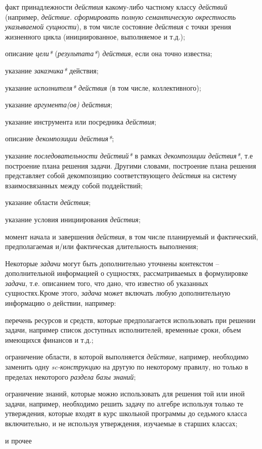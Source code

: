 \begin{SCn}
\begin{scnsubstruct}
{\begin{scnitemize}
\item факт принадлежности \textit{действия} какому-либо частному классу \textit{действий} (например,\textit{ действие. сформировать полную семантическую окрестность указываемой сущности}), в том числе состояние \textit{действия} с точки зрения жизненного цикла (инициированное, выполняемое и т.д.);\item описание \textit{цели*} (\textit{результата*}) \textit{действия}, если она точно известна;\item указание \textit{заказчика*} действия;\item указание \textit{исполнителя* действия} (в том числе, коллективного);\item указание \textit{аргумента(ов) действия\scnrolesign};\item указание инструмента или посредника \textit{действия};\item описание \textit{декомпозиции действия*};\item указание \textit{последовательности действий*} в рамках \textit{декомпозиции действия*}, т.е построение плана решения задачи. Другими словами, построение плана решения представляет собой декомпозицию соответствующего \textit{действия} на систему взаимосвязанных между собой поддействий;\item указание области \textit{действия};\item указание условия инициирования \textit{действия};\item момент начала и завершения \textit{действия}, в том числе планируемый и фактический, предполагаемая и/или фактическая длительность выполнения;\end{scnitemize}
Некоторые \textit{задачи} могут быть дополнительно уточнены контекстом -- дополнительной информацией о сущностях, рассматриваемых в формулировке \textit{задачи}, т.е. описанием того, что дано, что известно об указанных сущностях.Кроме этого, \textit{задача} может включать любую дополнительную информацию о действии, например:\begin{scnitemize}
\item перечень ресурсов и средств, которые предполагается использовать при решении задачи, например список доступных исполнителей, временные сроки, объем имеющихся финансов и т.д.;\item ограничение области, в которой выполняется \textit{действие}, например, необходимо заменить одну \textit{\mbox{sc-конструкцию}} на другую по некоторому правилу, но только в пределах некоторого \textit{раздела базы знаний};\item ограничение знаний, которые можно использовать для решения той или иной задачи, например, необходимо решить задачу по алгебре используя только те утверждения, которые входят в курс школьной программы до седьмого класса включительно, и не используя утверждения, изучаемые в старших классах;\item и прочее\end{scnitemize}
}
\end{scnsubstruct}
\end{SCn}
